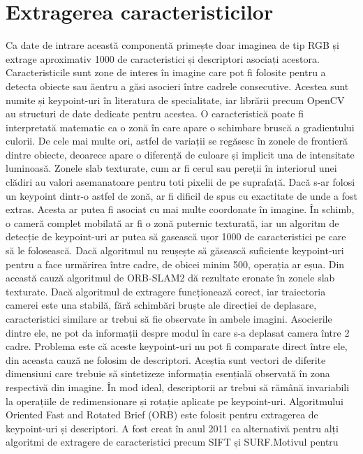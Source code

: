 \documentclass[12pt,a4paper]{report}
\begin{document}
\section{Extragerea caracteristicilor} 
Ca date de intrare această componentă primește doar imaginea de tip RGB și extrage
aproximativ 1000 de caracteristici și descriptori asociați acestora. Caracteristicile sunt zone
de interes în imagine care pot fi folosite pentru a detecta obiecte sau ăentru a găsi asocieri 
între cadrele consecutive. Acestea sunt numite și keypoint-uri în literatura de 
specialitate, iar librării precum OpenCV au structuri de date dedicate pentru acestea.
O caracteristică poate fi interpretată matematic ca o zonă în care apare o schimbare 
bruscă a gradientului culorii. De cele mai multe ori, astfel de variații se regăsesc 
în zonele de frontieră dintre obiecte, deoarece apare o diferență
de culoare și implicit una de intensitate luminoasă. Zonele slab texturate, cum ar 
fi cerul sau pereții în interiorul unei clădiri au valori asemanatoare pentru
toti pixelii de pe suprafață. Dacă s-ar folosi un keypoint dintr-o astfel de zonă, 
ar fi dificil de spus cu exactitate de unde a fost extras. Acesta ar putea fi asociat cu 
mai multe coordonate în imagine. În schimb, o cameră 
complet mobilată ar fi o zonă puternic texturată, iar un algoritm de detecție de 
keypoint-uri ar putea să gasească ușor 1000 de caracteristici pe care să le folosească.
Dacă algoritmul nu reușește să găsească suficiente keypoint-uri pentru a face urmărirea
între cadre, de obicei minim 500, operația ar eșua. Din această
cauză algoritmul de ORB-SLAM2 dă rezultate eronate în zonele slab texturate. Dacă algoritmul
de extragere funcționează corect, iar traiectoria camerei este una stabilă, fără schimbări
bruște ale direcției de deplasare, caracteristici similare ar trebui să fie observate în ambele
imagini. Asocierile dintre ele, ne pot da informații despre modul în care s-a deplasat 
camera între 2 cadre. Problema este că aceste keypoint-uri nu pot fi comparate direct
între ele, din aceasta cauză ne folosim de descriptori. Aceștia sunt vectori de diferite 
dimensiuni care trebuie să sintetizeze informația esențială observată în zona respectivă din
imagine. În mod ideal, descriptorii ar trebui să rămână invariabili la operațiile de 
redimensionare și rotație aplicate pe keypoint-uri. 
Algoritmului Oriented Fast and Rotated Brief (ORB)\cite{Rublee2011ORBAE} este folosit
pentru extragerea de 
keypoint-uri și descriptori. A fost creat în anul 2011 ca alternativă pentru alți algoritmi
de extragere de caracteristici precum SIFT\cite{sift} și SURF\cite{bay2006surf}.\@ Motivul pentru
\end{document}
